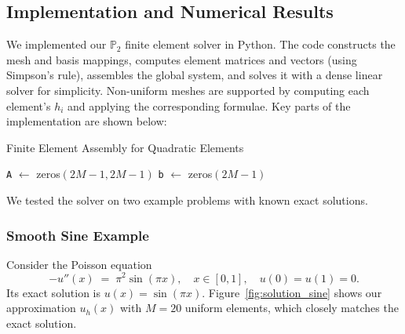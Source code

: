 \documentclass[a4paper,10pt]{article}
\begin{document}
\subsection{Implementation and Numerical Results}
We implemented our \(\mathbb{P}_2\) finite element solver in Python. The code constructs
the mesh and basis mappings, computes element matrices and vectors (using Simpson's rule),
assembles the global system, and solves it with a dense linear solver for simplicity.
Non-uniform meshes are supported by computing each element's \(h_i\) and applying the
corresponding formulae. Key parts of the implementation are shown below:

\begin{algorithm}[H]
	\caption{Finite Element Assembly for Quadratic Elements}
	\label{alg:FEM_assembly}
	\BlankLine
	\texttt{A} \(\leftarrow\) zeros\((2M-1, 2M-1)\)\;
	\texttt{b} \(\leftarrow\) zeros\((2M-1)\)\;
	\BlankLine
	\BlankLine
\end{algorithm}

We tested the solver on two example problems with known exact solutions.

\subsubsection*{Smooth Sine Example}
Consider the Poisson equation
\[
	-u''(x) \;=\; \pi^2 \sin(\pi x), \quad x \in [0,1], \quad u(0)=u(1)=0.
\]
Its exact solution is \(u(x) = \sin(\pi x)\). Figure~\ref{fig:solution_sine}
shows our approximation \(u_h(x)\) with \(M=20\) uniform elements, which closely
matches the exact solution.
\end{document}
